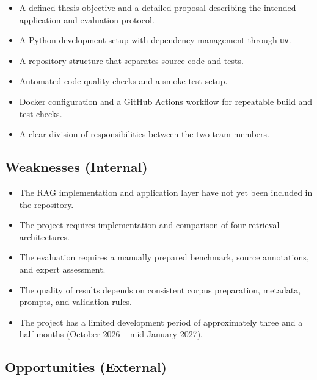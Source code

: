 \documentclass[12pt,a4paper]{article}
\begin{document}
\begin{itemize}
    \item A defined thesis objective and a detailed proposal
    describing the intended application and evaluation protocol.

    \item A Python development setup with dependency management
    through \texttt{uv}.

    \item A repository structure that separates source code
    and tests.

    \item Automated code-quality checks and a smoke-test setup.

    \item Docker configuration and a GitHub Actions workflow
    for repeatable build and test checks.

    \item A clear division of responsibilities between the
    two team members.
\end{itemize}

\subsection{Weaknesses (Internal)}

\begin{itemize}
    \item The RAG implementation and application layer have
    not yet been included in the repository.

    \item The project requires implementation and comparison
    of four retrieval architectures.

    \item The evaluation requires a manually prepared benchmark,
    source annotations, and expert assessment.

    \item The quality of results depends on consistent corpus
    preparation, metadata, prompts, and validation rules.

    \item The project has a limited development period of
    approximately three and a half months (October 2026 --
    mid-January 2027).
\end{itemize}

\subsection{Opportunities (External)}
\end{document}
